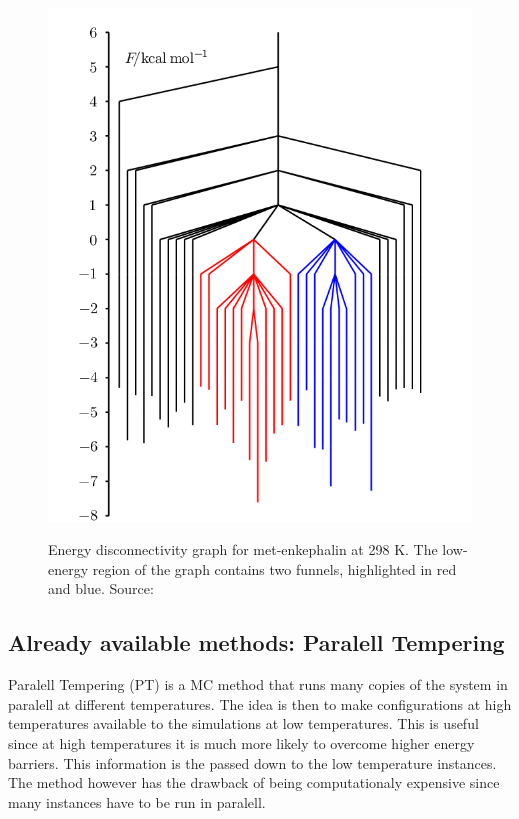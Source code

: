 \documentclass[11pt]{scrartcl} %
\begin{document}
\begin{figure}[h!]
	\center
	\includegraphics[scale=0.3]{figures/funnels.png}
	\label{fig:funnels}
	\caption{Energy disconnectivity graph for met-enkephalin at 298 K. The low-energy region of the graph contains two funnels, highlighted in red and blue. Source: \cite{Wales2005}}
\end{figure}
\subsection{Already available methods: Paralell Tempering}
Paralell Tempering (PT) is a MC method that runs many copies of the system in paralell at different temperatures. The idea is then to make configurations at high temperatures available to the simulations at low temperatures. This is useful since at high temperatures it is much more likely to overcome higher energy barriers. This information is the passed down to the low temperature instances. The method however has the drawback of being computationaly expensive since many instances have to be run in paralell.
\end{document}
